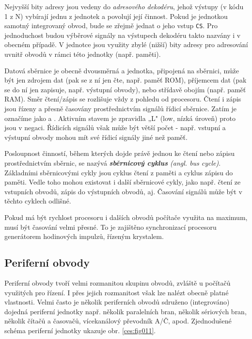 
      Nejvyšší bity adresy jsou vedeny do \emph{adresového dekodéru}, jehož výstupy (v kódu 1 z N) 
      vybírají jednu z jednotek a povolují její činnost. Pokud je jednotkou samotný integrovaný 
      obvod, bude se zřejmě jednat o jeho vstup \texttt{CS}. Pro jednoduchost budou výběrové 
      signály na výstupech dekodéru takto nazvány i v obecném případě. V jednotce jsou využity 
      zbylé (nižší) bity adresy pro adresování uvnitř obvodů v rámci této jednotky (např. paměti).
      
      Datová sběrnice je obecně dvousměrná a jednotka, připojená na sběrnici, může být jen zdrojem 
      dat (pak se z ní jen čte, např. paměť ROM), příjemcem dat (pak se do ní jen zapisuje, např. 
      výstupní obvody), nebo střídavě obojím (např. paměť RAM). Směr čtení/zápis se rozlišuje vždy 
      z pohledu od procesoru. Čtení i zápis jsou řízeny a přesně časovány prostřednictvím signálů 
      řídicí sběrnice. Zatím je označíme jako  a . Aktivním stavem je 
      zpravidla „L" (low, nízká úroveň) proto jsou v negaci. Řídicích signálů však může být větší 
      počet - např. vstupní a výstupní obvody mohou mít své řídicí signály jiné než paměť.
      
      Posloupnost činností, během kterých dojde právě jednou ke čtení nebo zápisu prostřednictvím 
      sběrnic, se nazývá \emph{\textbf{sběrnicový cyklus} (angl. bus cycle)}. Základními 
      sběrnicovými cykly jsou cyklus čtení z paměti a cyklus zápisu do paměti. Vedle toho mohou 
      existovat i další sběrnicové cykly, jako např. čtení ze vstupních obvodů, zápis do výstupních 
      obvodů, aj. Časování signálů může být v těchto cyklech odlišné.
      
      Pokud má být rychlost procesoru i dalších obvodů počítače využita na maximum, musí být 
      časování velmi přesné. To je zajištěno synchronizací procesoru generátorem hodinových 
      impulzů, řízeným krystalem.

    \subsection{Periferní obvody}\label{ces:IchapIVsecIssecII}
      Periferní obvody tvoří velmi rozmanitou skupinu obvodů, zvlá\-ště u počítačů využitých pro 
      řízení. I přes jejich rozmanitost však lze nalézt obecně platné vlastnosti. Velmi často je 
      několik periferních obvodů sdruženo (integrováno) dojedná periferní jednotky např. několik 
      paralelních bran, několik sériových bran, několik čítačů a časovačů, vícekanálový převodník 
      A/Č, apod. Zjednodušené schéma periferní jednotky ukazuje obr. \ref{ces:fig011}.

